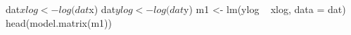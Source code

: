 \begin{Schunk}
\begin{Sinput}
 dat$xlog <- log(dat$x)
 dat$ylog <- log(dat$y)
 m1 <- lm(ylog ~ xlog, data = dat)
 head(model.matrix(m1))
\end{Sinput}
\end{Schunk}
